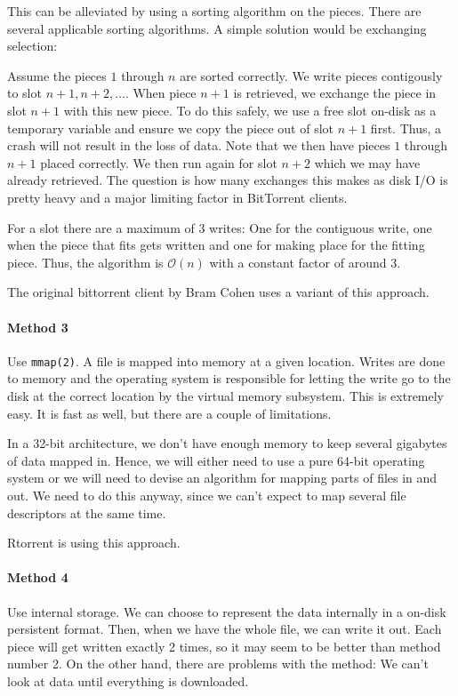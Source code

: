 \documentclass[a4paper]{memoir}
\begin{document}
This can be alleviated by using a sorting algorithm on the
pieces. There are several applicable sorting algorithms. A simple
solution would be exchanging selection:

Assume the pieces $1$ through $n$ are sorted correctly. We write
pieces contigously to slot $n+1, n+2, \dotsc$. When piece $n+1$ is
retrieved, we exchange the piece in slot $n+1$ with this new piece. To
do this safely, we use a free slot on-disk as a temporary variable and
ensure we copy the piece out of slot $n+1$ first. Thus, a crash will
not result in the loss of data. Note that we then have pieces $1$
through $n+1$ placed correctly. We then run again for slot $n+2$ which
we may have already retrieved. The question is how many exchanges this
makes as disk I/O is pretty heavy and a major limiting factor in
BitTorrent clients.

For a slot there are a maximum of 3 writes: One for the contiguous
write, one when the piece that fits gets written and one for making
place for the fitting piece. Thus, the algorithm is $\mathcal{O}(n)$
with a constant factor of around 3.

The original bittorrent client by Bram Cohen uses a variant of this
approach.

\paragraph{Method 3}
Use \texttt{mmap(2)}. A file is mapped into memory at a given
location. Writes are done to memory and the operating system is
responsible for letting the write go to the disk at the correct
location by the virtual memory subsystem. This is extremely easy. It
is fast as well, but there are a couple of limitations.

In a 32-bit architecture, we don't have enough memory to keep
several gigabytes of data mapped in. Hence, we will either need to use
a pure 64-bit operating system or we will need to devise an algorithm
for mapping parts of files in and out. We need to do this anyway,
since we can't expect to map several file descriptors at the same
time.

Rtorrent is using this approach.

\paragraph{Method 4}
Use internal storage. We can choose to represent the data internally
in a on-disk persistent format. Then, when we have the whole file, we
can write it out. Each piece will get written exactly 2 times, so it
may seem to be better than method number 2. On the other hand, there
are problems with the method: We can't look at data until everything
is downloaded.
\end{document}
